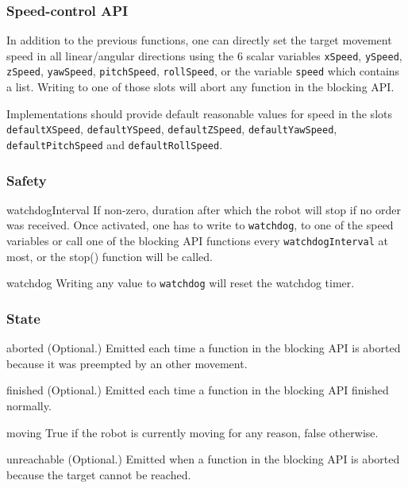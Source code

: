 \subsubsection{Speed-control API}

In addition to the previous functions, one can directly set the target
movement speed in all linear/angular directions using the 6 scalar variables
\lstinline{xSpeed}, \lstinline{ySpeed}, \lstinline{zSpeed},
\lstinline{yawSpeed}, \lstinline{pitchSpeed}, \lstinline{rollSpeed}, or the
variable \lstinline{speed} which contains a list.  Writing to one of those
slots will abort any function in the blocking API.

Implementations should provide default reasonable values for speed in the
slots \lstinline{defaultXSpeed}, \lstinline{defaultYSpeed},
\lstinline{defaultZSpeed}, \lstinline{defaultYawSpeed},
\lstinline{defaultPitchSpeed} and \lstinline{defaultRollSpeed}.

\subsubsection{Safety}

\begin{urbiscriptapi}
\item{watchdogInterval} If non-zero, duration after which the robot will
  stop if no order was received. Once activated, one has to write to
  \lstinline|watchdog|, to one of the speed variables or call one of the
  blocking API functions every \lstinline|watchdogInterval| at most, or the
  stop() function will be called.
\item{watchdog} Writing any value to \lstinline|watchdog| will reset the
  watchdog timer.
\end{urbiscriptapi}

\subsubsection{State}

\begin{urbiscriptapi}
\item[aborted]{} (Optional.) Emitted each time a function in the blocking
  API is aborted because it was preempted by an other movement.


\item[finished]{} (Optional.) Emitted each time a function in the blocking
  API finished normally.


\item[moving] True if the robot is currently moving for any reason, false
  otherwise.


\item[unreachable]{} (Optional.) Emitted when a function in the blocking API
  is aborted because the target cannot be reached.
\end{urbiscriptapi}

